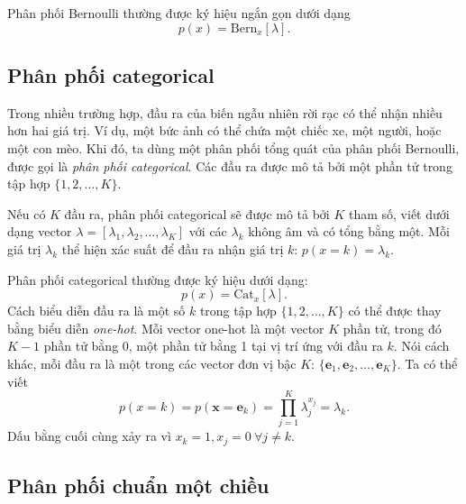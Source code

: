 Phân phối Bernoulli thường được ký hiệu ngắn gọn dưới dạng
\begin{equation}
\label{eqn:30_30}
p(x) = \text{Bern}_x [\lambda].
\end{equation}

\subsection{Phân phối categorical}
Trong nhiều trường hợp, đầu ra của biến ngẫu nhiên rời rạc có thể nhận nhiều hơn
hai giá trị. Ví dụ, một bức ảnh có thể chứa một chiếc xe, một người, hoặc một
con mèo. Khi đó, ta dùng một phân phối tổng quát của phân phối Bernoulli, được
gọi là \textit{phân phối categorical}. Các đầu ra được mô tả bởi một phần tử
trong tập hợp $\{1, 2, \dots, K\}$.

Nếu có $K$ đầu ra, phân phối categorical sẽ được mô tả bởi $K$ tham số, viết
dưới dạng vector $\lambda = [\lambda_1, \lambda_2, \dots, \lambda_K]$ với các
$\lambda_k$ không âm và có tổng bằng một. Mỗi giá trị $\lambda_k$ thể hiện xác
suất để đầu ra nhận giá trị $k$:
\begin{math}
p(x = k) = \lambda_k
\end{math}.

Phân phối categorical thường được ký hiệu dưới dạng:
\begin{equation}
p(x) = \text{Cat}_x [\lambda].
\end{equation}
Cách biểu diễn đầu ra là một số $k$ trong tập hợp $\{1, 2, \dots, K\}$ có thể
được thay bằng biểu diễn \textit{one-hot}. Mỗi vector one-hot là một vector $K$
phần tử, trong đó $K-1$ phần tử bằng 0, một phần tử bằng 1 tại vị trí ứng với
đầu ra $k$. Nói cách khác, mỗi đầu ra là một trong các vector đơn vị bậc $K$:
$\{\mathbf{e}_1, \mathbf{e}_2,\dots, \mathbf{e}_K\}$. Ta có thể viết
\begin{equation}
\label{eqn:30_31}
p(x = k) = p(\mathbf{x} = \mathbf{e}_k) = \prod_{j=1}^K \lambda_j^{x_j} = \lambda_k.
\end{equation}
Dấu bằng cuối cùng xảy ra vì $x_k = 1, x_j = 0~\forall j \neq k$.


\subsection{Phân phối chuẩn một chiều}

